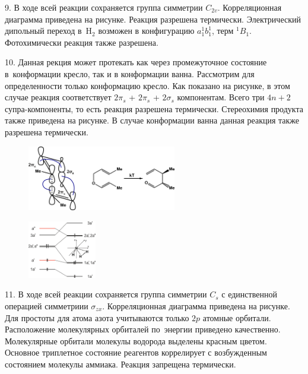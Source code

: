 9. В ходе всей реакции сохраняется группа симметрии $C_{2v}$. Корреляционная диаграмма приведена на рисунке. Реакция разрешена термически. Электрический дипольный переход в~H$_2$ возможен в конфигурацию $a_1^1b_1^1$, терм $^1B_1$. Фотохимически реакция также разрешена.\par
10. Данная рекция может протекать как через промежуточное состояние в~конформации кресло, так и в конформации ванна. Рассмотрим для определенности только конформацию кресло. Как показано на рисунке, в этом случае реакция соответствует $2\pi_s$ + $2\pi_s$ + $2\sigma_s$ компонентам. Всего три $4n+2$ супра-компоненты, то есть реакция разрешена термически. Стереохимия продукта также приведена на рисунке. В случае конформации ванна данная реакция также разрешена термически.\par
\vspace{-\parskip}
\vspace{1mm}
\begin{figure}[h]
\includegraphics[width=6.5cm]{images/Fig_2_1_10_dec.png}
\centering
\end{figure}
\par
\vspace{-\parskip}
\begin{figure} %
    \centering
    \vspace{4mm}
    \includegraphics[width=30mm]{images/Fig_2_1_11_dec.png}
    \vspace{-5mm}
\end{figure}
11. В ходе всей реакции сохраняется группа симметрии $C_s$ с единственной операцией симметриии $\sigma_{zx}$. Корреляционная диаграмма приведена на рисунке. Для простоты для атома азота учитываются только $2p$ атомные орбитали. Расположение молекулярных орбиталей по~энергии приведено качественно. Молекулярные орбитали молекулы водорода выделены красным цветом. Основное триплетное состояние реагентов коррелирует с возбужденным состоянием молекулы аммиака. Реакция запрещена термически.\par
